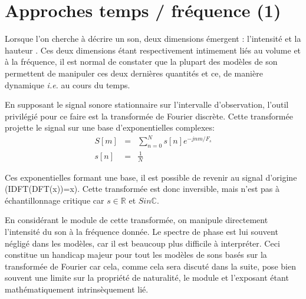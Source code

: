 \section{Approches temps / fréquence (1)}

Lorsque l'on cherche à décrire un son, deux dimensions émergent : l'intensité et la hauteur . Ces deux dimensions étant respectivement intimement liés au volume et à la fréquence, il est normal de constater que la plupart des modèles de son permettent de manipuler ces deux dernières quantités et ce, de manière dynamique \textit{i.e.} au cours du temps.

En supposant le signal sonore stationnaire sur l'intervalle d'observation, l'outil privilégié pour ce faire est la transformée de Fourier discrète. Cette transformée projette le signal sur une base d'exponentielles complexes:
\begin{eqnarray}
  S[m] &=& \sum_{n=0}^{N} s[n] e^{-jnm/F_s} \\
  s[n] &=&\frac{1}{N}
\end{eqnarray}

Ces exponentielles formant une base, il est possible de revenir au signal d'origine (IDFT(DFT(x))=x). Cette transformée est donc inversible, mais n'est pas à échantillonnage critique car $s\in \mathbb{R}$  et $S in \mathbb{C}$.

En considérant le module de cette transformée, on manipule directement l'intensité du son à la fréquence donnée. Le spectre de phase est lui souvent négligé dans les modèles, car il est beaucoup plus difficile à interpréter. Ceci constitue un handicap majeur pour tout les modèles de sons basés sur la transformée de Fourier car cela, comme cela sera discuté dans la suite, pose bien souvent une limite sur la propriété de naturalité, le module et l'exposant étant mathématiquement intrinsèquement lié.

